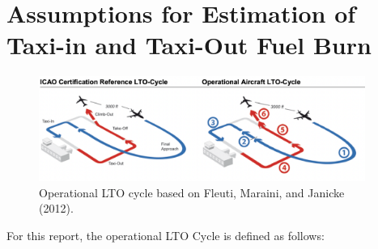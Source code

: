 \documentclass[
  a4paper,
  DIV=11,
  numbers=noendperiod]{scrreprt}
\begin{document}
\hypertarget{assumptions-for-estimation-of-taxi-in-and-taxi-out-fuel-burn}{%
\section{Assumptions for Estimation of Taxi-in and Taxi-Out Fuel
Burn}\label{assumptions-for-estimation-of-taxi-in-and-taxi-out-fuel-burn}}

\begin{figure}[h]

{\centering \includegraphics[width=0.95\textwidth,height=\textheight]{././figures/LTO-ZurichSimple.png}

}

\caption{\label{fig-lto-ops-concept}Operational LTO cycle based on
Fleuti, Maraini, and Janicke (2012).}

\end{figure}

For this report, the operational LTO Cycle is defined as follows:

\providecommand{\docline}[3]{\noalign{\global\setlength{\arrayrulewidth}{#1}}\arrayrulecolor[HTML]{#2}\cline{#3}}

\setlength{\tabcolsep}{2pt}

\renewcommand*{\arraystretch}{1.5}
\end{document}
